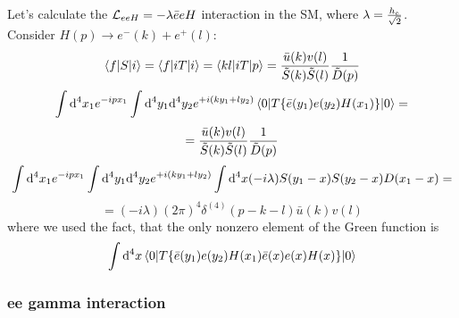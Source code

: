 Let's calculate the ${\mathcal L}_{eeH}=-\lambda \bar ee H$ interaction in the SM, where $\lambda={h_e\over\sqrt2}$. Consider $H(p)\to e^-(k)+e^+(l)$: 
\begin{equation*}
  \mathinner{\langle{f|S|i}\rangle}= \mathinner{\langle{f|iT|i}\rangle}= \mathinner{\langle{k l|iT|p}\rangle}= {\bar u(k) v(l)\over\tilde S(k)\tilde S(l)} {1\over\tilde D(p)}
\end{equation*}
\begin{equation*}
  \int{\rm d}^4 x_1 e^{-i p x_1} \int{\rm d}^4 y_1 {\rm d}^4 y_2 e^{+i(k y_1+l y_2)} \mathinner{\langle{0|T\{\bar e(y_1) e(y_2) H(x_1)\}|0}\rangle} =
\end{equation*}
\begin{equation*}
  = {\bar u(k) v(l)\over\tilde S(k)\tilde S(l)} {1\over\tilde D(p)}
\end{equation*}
\begin{equation*}
  \int{\rm d}^4 x_1 e^{-i p x_1} \int{\rm d}^4 y_1 {\rm d}^4 y_2 e^{+i(k y_1+l y_2)}\int{\rm d}^4 x (-i\lambda) S(y_1-x)S(y_2-x)D(x_1-x) =
\end{equation*}
\begin{equation*}
  =(-i\lambda)(2\pi)^4\delta^{(4)}(p-k-l)\bar u(k) v(l)
\end{equation*}
where we used the fact, that the only nonzero element of the Green function is 
\begin{equation*}
  \int{\rm d}^4 x \mathinner{\langle{0|T\{\bar e(y_1) e(y_2) H(x_1)\bar e(x)e(x) H(x)\}|0}\rangle}
\end{equation*}

\subsubsection{ee gamma interaction}


